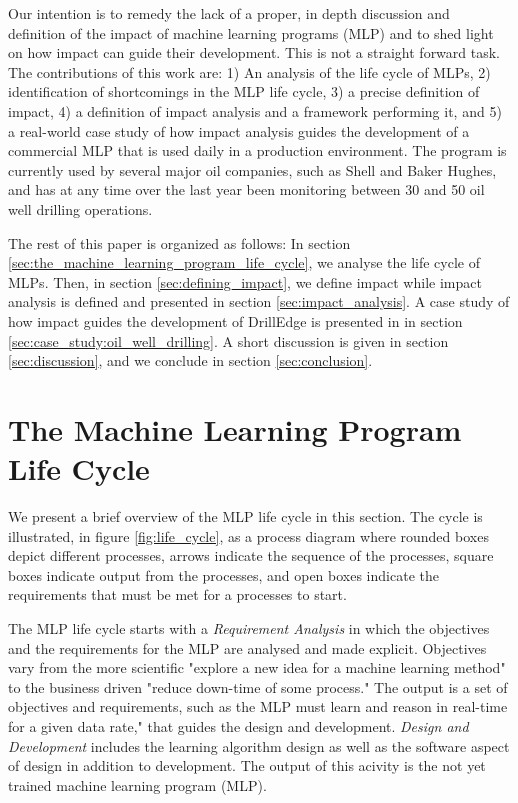\documentclass{article}
\begin{document}
Our intention is to remedy the lack of a proper, in depth discussion and definition of the impact of machine learning programs (MLP) and to shed light on how impact can guide their development.
This is not a straight forward task.
The contributions of this work are: 1) An analysis of the life cycle of MLPs, 2) identification of shortcomings in the MLP life cycle, 3)  a precise definition of impact, 4) a definition of impact analysis and a framework performing it, and 5) a real-world case study of how impact analysis guides the development of a commercial MLP that is used daily in a production environment. 
The program is currently used by several major oil companies, such as Shell and Baker Hughes, and has at any time over the last year been monitoring between 30 and 50 oil well drilling operations.

The rest of this paper is organized as follows:
In section \ref{sec:the_machine_learning_program_life_cycle}, we analyse the life cycle of MLPs.
Then, in section \ref{sec:defining_impact}, we define impact while impact analysis is defined and presented in section \ref{sec:impact_analysis}. 
A case study of how impact guides the development of DrillEdge is presented in in section \ref{sec:case_study:oil_well_drilling}.
A short discussion is given in section \ref{sec:discussion}, and we conclude in section \ref{sec:conclusion}.

\section{The Machine Learning Program Life Cycle}
We present a brief overview of the MLP life cycle in this section.
The cycle is illustrated, in figure \ref{fig:life_cycle}, as a process diagram where rounded boxes depict different processes, arrows indicate the sequence of the processes, square boxes indicate output from the processes, and open boxes indicate the requirements that must be met for a processes to start.

The MLP life cycle starts with a \emph{Requirement Analysis} in which the objectives and the requirements for the MLP are analysed and made explicit.
Objectives vary from the more scientific "explore a new idea for a machine learning method" to the business driven "reduce down-time of some process."
The output is a set of objectives and requirements, such as the MLP must learn and reason in real-time for a given data rate," that guides the design and development. 
\emph{Design and Development} includes the learning algorithm design as well as the software aspect of design in addition to development.
The output of this acivity is the not yet trained machine learning program (MLP). 
\end{document}
